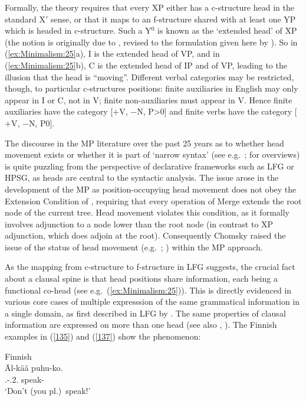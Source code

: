 \documentclass[output=paper,hidelinks]{langscibook}
\begin{document}
Formally, the theory requires that every XP either has a c-structure
head in the standard X$'$ sense, or that it maps to an f-structure
shared with at least one YP which is headed in c-structure. Such a
Y$^0$ is known as the `extended head' of XP (the notion is
originally due to \citealp[221]{zaenen-kaplan1995}, revised to the
formulation given here by \citealp[353]{bresnan00opt}). So in
(\ref{ex:Minimalism:25}a), I is the extended head of VP, and in (\ref{ex:Minimalism:25}b), C is the
extended head of IP and of VP, leading to the illusion that the head
is ``moving''. Different verbal categories may be restricted, though,
to particular c-structures positions: finite auxiliaries in English
may only appear in I or C, not in V; finite non-auxiliaries must
appear in V. Hence finite auxiliaries have the category [$+$V, $-$N,
  P\textgreater0] and finite verbs have the category [$+$V, $-$N, P0].


The discourse in the MP literature over the past 25 years as to
whether head movement exists or whether it is part of `narrow
syntax' (see e.g.~\citealp{roberts11}; \citealp{harigrib19} for
overviews) is quite puzzling from the perspective of declarative
frameworks such as LFG or HPSG, as heads are central to the syntactic
analysis. The issue arose in the development of the MP as
position-occupying head movement does not obey the Extension Condition
of \citet{chomsky1995the-minimalist}, requiring that every operation
of Merge extends the root node of the current tree. Head movement
violates this condition, as it formally involves adjunction to a node
lower than the root node (in contrast to XP adjunction, which does
adjoin at the root). Consequently Chomsky raised the issue of the
status of head movement (e.g.~\citealp[136--137]{chomsky00};
\citealp[38]{chomsky01}) within the MP approach.

As the mapping from c-structure to f-structure in LFG suggests, the
crucial fact about a clausal spine is that head positions share
information, each being a functional co-head (see
e.g.~(\ref{ex:Minimalism:25})). This is directly evidenced in various core cases of
multiple expresssion of the same grammatical information in a single
domain, as first described in LFG by \citet{Nino1997}. The same
properties of clausal information are expressed on more than one head
(see also \citealp{Sells2004}, \citealp{Lodrup2014}). The Finnish
examples in (\ref{135}) and (\ref{137}) \citep[135,~137]{Nino1997} show the
phenomenon:

\ea\label{135} Finnish\\
\gll \"Al-k\"a\"a puhu-ko.\\
\NEG.\IMP-\IMP.2.{\PL} speak-\IMP\\
\glt `Don't (you pl.)\ speak!'
\z
\end{document}
